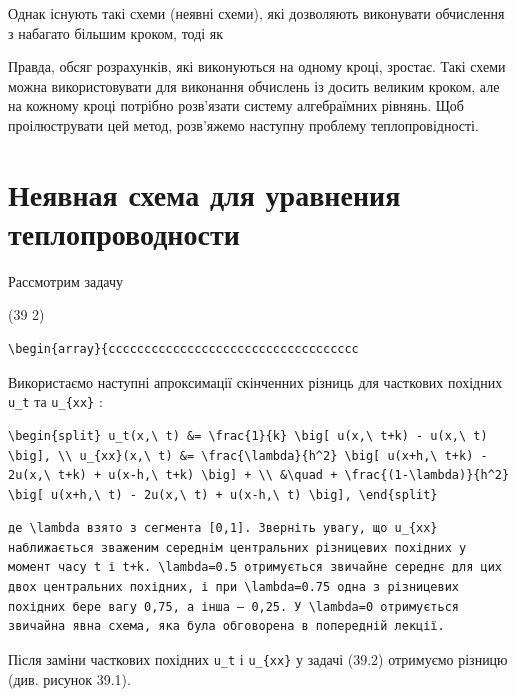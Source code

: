\documentclass[
  ukrainian,
]{article}
\begin{document}
Однак існують такі схеми (неявні схеми), які дозволяють виконувати
обчислення з набагато більшим кроком, тоді як

Правда, обсяг розрахунків, які виконуються на одному кроці, зростає.
Такі схеми можна використовувати для виконання обчислень із досить
великим кроком, але на кожному кроці потрібно розв'язати систему
алгебраїмних рівнянь. Щоб проілюструвати цей метод, розв'яжемо наступну
проблему теплопровідності.

\section{Неявная схема для уравнения
теплопроводности}\label{ux43dux435ux44fux432ux43dux430ux44f-ux441ux445ux435ux43cux430-ux434ux43bux44f-ux443ux440ux430ux432ux43dux435ux43dux438ux44f-ux442ux435ux43fux43bux43eux43fux440ux43eux432ux43eux434ux43dux43eux441ux442ux438}

Рассмотрим задачу

(39 2)

\begin{verbatim}
\begin{array}{ccccccccccccccccccccccccccccccccccc
\end{verbatim}

Використаємо наступні апроксимації скінченних різниць для часткових
похідних \texttt{u\_t} та \texttt{u\_\{xx\}} :

\begin{verbatim}
\begin{split} u_t(x,\ t) &= \frac{1}{k} \big[ u(x,\ t+k) - u(x,\ t) \big], \\ u_{xx}(x,\ t) &= \frac{\lambda}{h^2} \big[ u(x+h,\ t+k) - 2u(x,\ t+k) + u(x-h,\ t+k) \big] + \\ &\quad + \frac{(1-\lambda)}{h^2} \big[ u(x+h,\ t) - 2u(x,\ t) + u(x-h,\ t) \big], \end{split}
\end{verbatim}

\begin{verbatim}
де \lambda взято з сегмента [0,1]. Зверніть увагу, що u_{xx} наближається зваженим середнім центральних різницевих похідних у момент часу t і t+k. \lambda=0.5 отримується звичайне середнє для цих двох центральних похідних, і при \lambda=0.75 одна з різницевих похідних бере вагу 0,75, а інша — 0,25. У \lambda=0 отримується звичайна явна схема, яка була обговорена в попередній лекції.
\end{verbatim}

Після заміни часткових похідних \texttt{u\_t} і \texttt{u\_\{xx\}} у
задачі (39.2) отримуємо різницю (див. рисунок 39.1).
\end{document}
